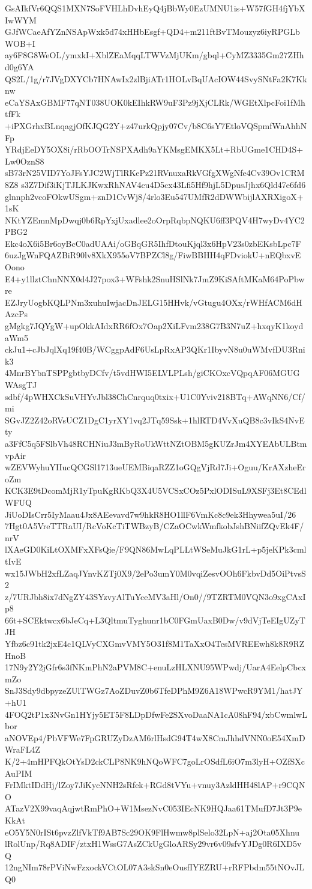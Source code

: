 GsAIkfVr6QQS1MXN7SoFVHLhDvhEyQ4jBbWy0EzUMNU1is+W57fGH4fjYbXIwWYM
GJfWCaeAfYZnNSApWxk5d74xHHbEsgf+QD4+m211ftBvTMouzyz6iyRPGLbWOB+I
ay6F8G8WeOL/ymxkI+XblZEaMqqLTWVzMjUKm/gbql+CyMZ3335Gm27ZHhd0g6YA
QS2L/1g/r7JVgDXYCb7HNAwIx2zlBjiATr1HOLvBqUAcIOW44SvySNtFa2K7Kknw
eCaYSAxGBMF77qNT038UOK0kEIhkRW9uF3Pz9jXjCLRk/WGEtXlpcFoi1fMhtfFk
+iPXGrhxBLnqagjOfKJQG2Y+z47urkQpjy07Cv/b8C6sY7EtloVQSpmfWnAhhNFp
YRdjEeDY5OX8i/rRbOOTrNSPXAdh9aYKMsgEMKX5Lt+RbUGme1CHD4S+Lw0OznS8
sB73rN25VID7YoJFsYJC2WjTlRKePz21RVnuxaRkVGfgXWgNfe4Cv39Ov1CRM8Z8
s3Z7Dif3iKjTJLKJKwxRhNAV4cu4D5cx43Lfi5Hf9hjL5DpusJjhx6Qld47e6fd6
glnnph2vcoFOkwUSgm+znD1CvWj8/4rlo3Eu547UMfR2dDWWbijlAXRXigoX+1sK
NKtYZEmnMpDwqj0b6RpYxjUxadlee2oOrpRqbpNQKU6ff3PQV4H7wyDv4YC2PBG2
Ekc4oX6i5Br6oyBcC0adUAAi/oGBqGR5IhfDtouKjql3x6HpV23s0zbEKsbLpc7F
6uzJgWnFQAZBiR90lv8XkX955oV7BPZCl8g/FiwBBHH4qFDviokU+nEQbxvEOono
E4+y1llztChnNNX0d4J27pox3+WFshk2SnuHSlNk7JmZ9KiSAftMKaM64PoPbwre
EZJryUogbKQLPNm3xuhuIwjacDnJELG15HHvk/vGtugu4OXx/rWHfACM6dHAzcPs
gMgkg7JQYgW+upOkkAIdxRR6fOx7Oap2XiLFvm238G7B3N7uZ+hxqyK1koydaWm5
ckJu1+cJbJqlXq19f40B/WCggpAdF6UsLpRxAP3QKr1IbyvN8u0uWMvfDU3Rnik3
4MnrBYbnTSPPgbtbyDCfv/t5vdHWI5ELVLPLsh/giCKOxcVQpqAF06MGUGWAsgTJ
sdbf/4pWHXCkSuVHYvJbl38ChCnrquq0txix+U1C0Yviv218BTq+AWqNN6/Cf/mi
SGvJZ2Z42oRVsUCZ1DgC1yrXY1vq2JTq59Ssk+1hlRTD4VvXuQB8c3vIkS4NvEty
a3FfC5q5FSlbVh48RCHNiuJ3mByRoUkWttNZtOBM5gKUZrJm4XYEAbULBtmvpAir
wZEVWyhuYIIucQCGSl1713ueUEMBiqaRZZ1oGQgVjRd7Ji+Oguu/KrAXzheEroZm
KCK3E9tDcomMjR1yTpuKgRKbQ3X4U5VCSxCOz5PxlODISuL9XSFj3Et8CEdlWFUQ
JiUoDIsCrr5IyMaau4Jx8AEevavd7w9hkR8HO1llF6VmKc8c9ek3Hhywea5uI/26
7Hgt0A5VreTTRaUI/RcVoKcTiTWBzyB/CZaOCwkWmfkobJshBNiifZQvEk4F/nrV
lXAeGD0KiLtOXMFxXFsQie/F9QN86MwLqPLLtWSeMuJkG1rL+p5jeKPk3cmltIvE
wx15JWbH2xfLZaqJYnvKZTj0X9/2ePo3umY0M0vqiZesvOOh6FkbvDd5OiPtvsS2
z/7URJbh8ix7dNgZY43SYzvyAlTuYceMV3aHl/On0//9TZRTM0VQN3o9xgCAxIp8
66t+SCEktwcx6bJeCq+L3QltmuTyghunr1bC0FGmUaxB0Dw/v9dVjTeEIgUZyTJH
Yfbz6c91tk2jxE4c1QLVyCXGmvVMY5O31f8M1TaXxO4TcsMVREEwh8k8R9RZHnoB
17N9y2Y2jGfr6s3fNKmPhN2aPVM8C+enuLzHLXNU95WPwdj/UarA4EelpCbcxmZo
SnJ3Sdy9dbpyzeZUlTWGz7AoZDuvZ0b6TfeDPhM9Z6A18WPwcR9YM1/hatJY+hU1
4FOQ2tP1x3NvGn1HYjy5ET5F8LDpDfwFe2SXvoDaaNA1cA08hF94/xbCwmlwLbor
aNOVEp4/PbVFWe7FpGRUZyDzAM6rlHsdG94T4wX8CmJhhdVNN0oE54XmDWraFL4Z
K/2+4mHPFQkOtYsD2ckCLP8NK9hNQoWFC7goLrOSdfL6iO7m3lyH+OZfSXcAuPIM
FrIMktIDdHj/lZoy7JiKycNNH2sRfek+RGd8tVYu+vnuy3AzldHH48lAP+r9CQNO
ATazV2X99vaqAqjwtRmPhO+W1MsezNvC053IEcNK9HQJaa61TMufD7Jt3P9eKkAt
eO5Y5N0rISt6pvzZlfVkTf9AB7Sc29OK9FlHwmw8plSelo32LpN+aj2Ota05Xhnu
lRolUnp/Rq8ADIF/ztxH1WssG7AsZCkUgGloARSy29vr6v09sfvYJDg0R6IXD5vQ
12ngNIm78rPViNwFzxockVCtOL07A3skSn0eOusfIYEZRU+rRFPbdm55tNOvJLQ0
